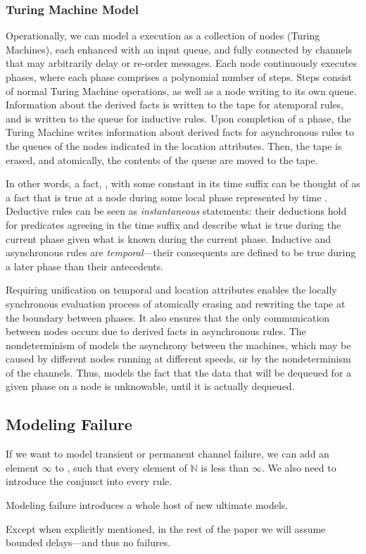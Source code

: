 \subsubsection{Turing Machine Model}

Operationally, we can model a \lang execution as a collection of nodes (Turing Machines), each enhanced with an input queue, and fully connected by channels that may arbitrarily delay or re-order messages.  Each node continuously executes phases, where each phase comprises a polynomial number of steps.  Steps consist of normal Turing Machine operations, as well as a node writing to its own queue.  Information about the derived facts is written to the tape for atemporal rules, and is written to the queue for inductive rules.  Upon completion of a phase, the Turing Machine writes information about derived facts for asynchronous rules to the queues of the nodes indicated in the location attributes.  Then, the tape is erased, and atomically, the contents of the queue are moved to the tape.

In other words, a fact, , with some constant  in its time suffix can be thought of as a fact that is true at a node during some local phase represented by time .  Deductive rules can be seen as {\em instantaneous} statements: their deductions hold for predicates agreeing in the time suffix and describe what is true during the current phase given what is known during the current phase. Inductive and asynchronous rules are {\em temporal}---their consequents are defined to be true during a later phase than their antecedents.

Requiring unification on temporal and location attributes enables the locally synchronous evaluation process of atomically erasing and rewriting the tape at the boundary between phases.  It also ensures that the only communication between nodes occurs due to derived facts in asynchronous rules.  The nondeterminism of  models the asynchrony between the machines, which may be caused by different nodes running at different speeds, or by the nondeterminism of the channels. Thus,  models the fact that the data that will be dequeued for a given phase on a node is unknowable, until it is actually dequeued.

\subsection{Modeling Failure}

If we want \lang to model transient or permanent channel failure, we can add an element $\infty$ to , such that every element of $\mathbb{N}$ is less than $\infty$.  We also need to introduce the conjunct  into every \lang rule.

Modeling failure introduces a whole host of new ultimate models. 

Except when explicitly mentioned, in the rest of the paper we will assume bounded delays---and thus no failures.
